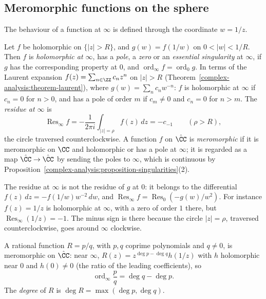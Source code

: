 \subsection{Meromorphic functions on the sphere}\label{complex-analysis:subsection-rational}

The behaviour of a function at $\infty$ is defined through the coordinate $w = 1/z$.

\begin{definition}\label{complex-analysis:definition-infinity}
Let $f$ be holomorphic on $\{|z| > R\}$, and $g(w) = f(1/w)$ on $0 < |w| < 1/R$. Then $f$ is \emph{holomorphic at $\infty$}, has a \emph{pole}, a \emph{zero} or an \emph{essential singularity} at
$\infty$, if $g$ has the corresponding property at $0$, and $\operatorname{ord}_\infty f = \operatorname{ord}_0g$. In terms of the Laurent expansion $f(z) = \sum_{n \in \ZZ}c_nz^n$ on $|z| > R$
(Theorem~\ref{complex-analysis:theorem-laurent}), where $g(w) = \sum_nc_nw^{-n}$: $f$ is holomorphic at $\infty$ if $c_n = 0$ for $n > 0$, and has a pole of order $m$ if $c_m \neq 0$ and $c_n = 0$ for $n > m$. The
\emph{residue at $\infty$} is
\[
\operatorname{Res}_\infty f = -\frac{1}{2\pi i}\int_{|z| = \rho}f(z)\,dz = -c_{-1} \qquad (\rho > R),
\]
the circle traversed counterclockwise. A function $f$ on $\hat{\CC}$ is \emph{meromorphic} if it is meromorphic on $\CC$ and holomorphic or has a pole at $\infty$; it is regarded as a map $\hat{\CC} \to \hat{\CC}$ by sending
the poles to $\infty$, which is continuous by Proposition~\ref{complex-analysis:proposition-singularities}(2).
\end{definition}

The residue at $\infty$ is not the residue of $g$ at $0$: it belongs to the differential $f(z)\,dz = -f(1/w)w^{-2}\,dw$, and $\operatorname{Res}_\infty f = \operatorname{Res}_0(-g(w)/w^2)$. For instance $f(z) = 1/z$ is
holomorphic at $\infty$, with a zero of order $1$ there, but $\operatorname{Res}_\infty(1/z) = -1$. The minus sign is there because the circle $|z| = \rho$, traversed counterclockwise, goes around $\infty$ clockwise.

A rational function $R = p/q$, with $p, q$ coprime polynomials and $q \neq 0$, is meromorphic on $\hat{\CC}$: near $\infty$, $R(z) = z^{\deg p - \deg q}h(1/z)$ with $h$ holomorphic near $0$ and $h(0) \neq 0$ (the ratio
of the leading coefficients), so
\begin{equation}\label{complex-analysis:equation-order-infinity}
\operatorname{ord}_\infty\frac pq = \deg q - \deg p.
\end{equation}
The \emph{degree} of $R$ is $\deg R = \max(\deg p, \deg q)$.

